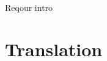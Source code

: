 \documentclass[../../main.tex]{subfiles}
\begin{document}
Reqour intro

\section{Translation}

\end{document}
